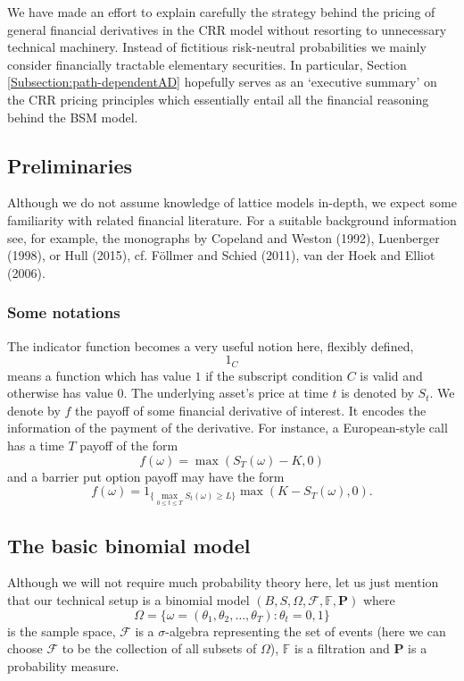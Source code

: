 \documentclass{amsart}
\theoremstyle{definition}
\theoremstyle{remark}
\numberwithin{equation}{section}
\newcommand{\1}{\boldsymbol{1}}
\begin{document}
We have made an effort to explain carefully the strategy behind the pricing of general financial derivatives in the CRR
model without resorting to unnecessary technical machinery. Instead of fictitious risk-neutral probabilities we mainly 
consider financially tractable elementary securities. In particular, Section \ref{Subsection:path-dependentAD} hopefully serves as an `executive summary' on the CRR pricing principles which essentially entail all the financial reasoning behind the BSM model.


\subsection{Preliminaries}

Although we do not assume knowledge of lattice models in-depth, we expect some familiarity 
with related financial literature. For a suitable background information see, for example, the monographs by Copeland and Weston (1992), Luenberger (1998), or Hull (2015), cf.  F{\"o}llmer and Schied (2011), van der Hoek and Elliot (2006). 
\subsubsection{Some notations} The indicator function becomes a very useful notion here, flexibly defined, 
\[1_{C}\] 
means a function which has value $1$ if the subscript condition $C$ is valid and otherwise has value $0$.
The underlying asset's price at time $t$ is denoted by $S_t$. We denote by $f$ the payoff of some financial derivative of interest. It encodes the information of the payment of the derivative. For instance, a European-style call has a time $T$ payoff of the form
\[f(\omega)=\max(S_T(\omega) - K , 0)\]
and a barrier put option payoff may have the form
\[f(\omega) = 1_{\{\max_{0\leq t\leq T} S_t(\omega) \geq L\}} \max(K-S_T(\omega) , 0).\] 



\subsection{The basic binomial model}

Although we will not require much probability theory here, let us just mention that our technical setup is a binomial model 
$(B,S,\Omega,\mathcal{F},\mathbb{F},\mathbf{P})$ where 
\[\Omega=\{\omega=(\theta_1 , \theta_2 , \ldots ,\theta_T)\colon \theta_t =0,1\}\] 
is the sample space, $\mathcal{F}$ is a $\sigma$-algebra representing the set of events (here we can choose $\mathcal{F}$ to be the collection of all subsets of $\Omega$), $\mathbb{F}$ is a filtration and $\mathbf{P}$ is a probability measure. 
\end{document}
